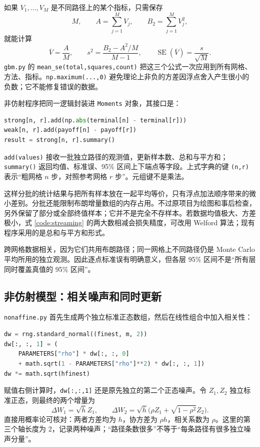 \documentclass[11pt,a4paper,fontset=none]{ctexart}
\numberwithin{equation}{section}
\begin{document}
如果 $V_1,\ldots,V_M$ 是不同路径上的某个指标，只需保存
\[
M,\qquad A=\sum_{j=1}^M V_j,\qquad B_2=\sum_{j=1}^M V_j^2,
\]
就能计算
\begin{equation}
\overline V=\frac{A}{M},\qquad
s^2=\frac{B_2-A^2/M}{M-1},\qquad
\operatorname{SE}(\overline V)=\frac{s}{\sqrt M}.
\label{code:streaming}
\end{equation}
\texttt{gbm.py} 的 \texttt{mean\_se(total,squares,count)} 把这三个公式一次应用到所有网格、方法、指标。\texttt{np.maximum(...,0)} 避免理论上非负的方差因浮点舍入产生很小的负数；它不能修复错误的数据。

非仿射程序把同一逻辑封装进 \texttt{Moments} 对象，其接口是：
\begin{lstlisting}[language=Python]
strong[n, r].add(np.abs(terminal[n] - terminal[r]))
weak[n, r].add(payoff[n] - payoff[r])
result = strong[n, r].summary()
\end{lstlisting}
\texttt{add(values)} 接收一批独立路径的观测值，更新样本数、总和与平方和；\texttt{summary()} 返回均值、标准误、95\% 区间上下端点等字段。上式字典的键 \texttt{(n,r)} 表示“粗网格 $n$ 步，对照参考网格 $r$ 步”。元组键不是乘法。

这样分批的统计结果与把所有样本放在一起平均等价，只有浮点加法顺序带来的微小差别。分批还能限制布朗增量数组的内存占用。不过原项目为绘图和事后检查，另外保留了部分或全部终值样本；它并不是完全不存样本。若数据均值极大、方差极小，式 \eqref{code:streaming} 的两大数相减会损失精度，可改用 Welford 算法；现有程序采用的是总和与平方和形式。

跨网格数据相关，因为它们共用布朗路径；同一网格上不同路径仍是 Monte Carlo 平均所用的独立观测。因此逐点标准误有明确意义，但各层 95\% 区间不是“所有层同时覆盖真值的 95\% 区间”。

\subsection{非仿射模型：相关噪声和同时更新}

\texttt{nonaffine.py} 首先生成两个独立标准正态数组，然后在线性组合中加入相关性：
\begin{lstlisting}[language=Python]
dw = rng.standard_normal((finest, m, 2))
dw[:, :, 1] = (
    PARAMETERS["rho"] * dw[:, :, 0]
    + math.sqrt(1 - PARAMETERS["rho"]**2) * dw[:, :, 1])
dw *= math.sqrt(hfinest)
\end{lstlisting}
赋值右侧计算时，\texttt{dw[:,:,1]} 还是原先独立的第二个正态噪声。令 $Z_1,Z_2$ 独立标准正态，则最终的两个增量为
\[
\Delta W_1=\sqrt h Z_1,\qquad
\Delta W_2=\sqrt h\bigl(\rho Z_1+\sqrt{1-\rho^2}Z_2\bigr).
\]
直接用概率论可核对：两者方差均为 $h$，协方差为 $\rho h$，相关系数为 $\rho$。这里的第三个轴长度为 2，记录两种噪声；“路径条数很多”不等于“每条路径有很多独立噪声分量”。
\end{document}
